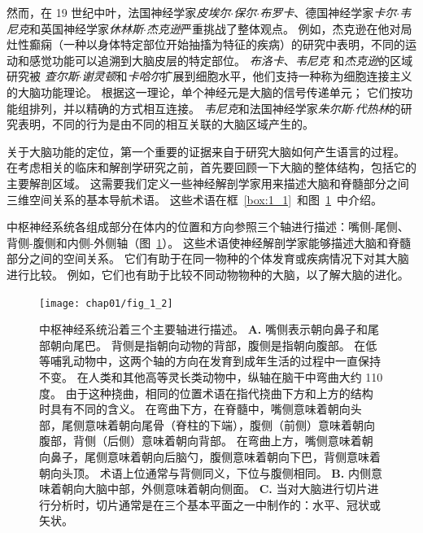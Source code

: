 然而，在 19 世纪中叶，法国神经学家\textit{皮埃尔$\cdot$保尔$\cdot$布罗卡}、德国神经学家\textit{卡尔$\cdot$韦尼克}和英国神经学家\textit{休林斯$\cdot$杰克逊}严重挑战了整体观点。
例如，杰克逊在他对局灶性癫痫（一种以身体特定部位开始抽搐为特征的疾病）的研究中表明，不同的运动和感觉功能可以追溯到大脑皮层的特定部位。
\textit{布洛卡}、\textit{韦尼克} 和\textit{杰克逊}的区域研究被 \textit{查尔斯$\cdot$谢灵顿}和\textit{卡哈尔}扩展到细胞水平，他们支持一种称为细胞连接主义的大脑功能理论。
根据这一理论，单个神经元是大脑的信号传递单元；
它们按功能组排列，并以精确的方式相互连接。
\textit{韦尼克}和法国神经学家\textit{朱尔斯$\cdot$代热林}的研究表明，不同的行为是由不同的相互关联的大脑区域产生的。


关于大脑功能的定位，第一个重要的证据来自于研究大脑如何产生语言的过程。
在考虑相关的临床和解剖学研究之前，首先要回顾一下大脑的整体结构，包括它的主要解剖区域。
这需要我们定义一些神经解剖学家用来描述大脑和脊髓部分之间三维空间关系的基本导航术语。
这些术语在框~\ref{box:1_1}~和图~\ref{fig:1_2}~中介绍。


\begin{proposition}[神经解剖学导航术语] \label{box:1_1}
	
	\quad \quad 中枢神经系统各组成部分在体内的位置和方向参照三个轴进行描述：嘴侧-尾侧、背侧-腹侧和内侧-外侧轴（图~\ref{fig:1_2}）。
	这些术语使神经解剖学家能够描述大脑和脊髓部分之间的空间关系。
	它们有助于在同一物种的个体发育或疾病情况下对其大脑进行比较。
	例如，它们也有助于比较不同动物物种的大脑，以了解大脑的进化。

\end{proposition}


\begin{figure}[htbp]
	\centering
	\texttt{[image: chap01/fig\_1\_2]}
	\caption{中枢神经系统沿着三个主要轴进行描述\cite{martin2012neuroanatomy}。 
		\textbf{A.} 嘴侧表示朝向鼻子和尾部朝向尾巴。
		背侧是指朝向动物的背部，腹侧是指朝向腹部。
		在低等哺乳动物中，这两个轴的方向在发育到成年生活的过程中一直保持不变。
		在人类和其他高等灵长类动物中，纵轴在脑干中弯曲大约 110 度。
		由于这种挠曲，相同的位置术语在指代挠曲下方和上方的结构时具有不同的含义。
		在弯曲下方，在脊髓中，嘴侧意味着朝向头部，尾侧意味着朝向尾骨（脊柱的下端），腹侧（前侧）意味着朝向腹部，背侧（后侧）意味着朝向背部。
		在弯曲上方，嘴侧意味着朝向鼻子，尾侧意味着朝向后脑勺，腹侧意味着朝向下巴，背侧意味着朝向头顶。
		术语上位通常与背侧同义，下位与腹侧相同。
		\textbf{B.} 内侧意味着朝向大脑中部，外侧意味着朝向侧面。
		\textbf{C.} 当对大脑进行切片进行分析时，切片通常是在三个基本平面之一中制作的：水平、冠状或矢状。}
	\label{fig:1_2}
\end{figure}



